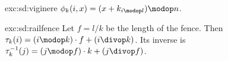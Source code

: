 \begin{exsolution}{exc:sd:viginere}
$\phi_k(i,x)=(x+k_{i\modop l})\modop n$.
\end{exsolution}

\begin{exsolution}{exc:sd:railfence}
Let $f=l/k$ be the length of the fence.
Then $\tau_k(i) = (i\modop k)\cdot f + (i\divop k)$.
Its inverse is $\tau_k^{-1}(j)=(j\modop f)\cdot k + (j\divop f)$.
\end{exsolution}